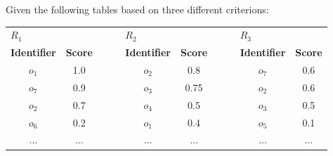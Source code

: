 \documentclass[12pt, a4paper]{report}
\newtheorem[style=M,bodystyle=\normalfont]{theorem}{Theorem}
\newtheorem[style=M,bodystyle=\normalfont]{corollary}{Corollary}
\newtheorem[style=M,bodystyle=\normalfont]{lemma}{Lemma}
\newtheorem[style=M,bodystyle=\normalfont]{definition}{Definition}
\begin{document}
    \begin{example}
        Given the following tables based on three different criterions: 
        \begin{table}[H]
            \centering
            \begin{tabular}{cccccccc}
            \multicolumn{1}{l}{$R_1$}                 & \multicolumn{1}{l}{}                & \multicolumn{1}{l}{$\:\:\:\:\:\:$} & \multicolumn{1}{l}{$R_2$}                & \multicolumn{1}{l}{}                & \multicolumn{1}{l}{$\:\:\:\:\:\:$} & \multicolumn{1}{l}{$R_3$}                & \multicolumn{1}{l}{}                \\ \cline{1-2} \cline{4-5} \cline{7-8} 
            \multicolumn{1}{|c}{\textbf{Identifier}} & \multicolumn{1}{c|}{\textbf{Score}} & \multicolumn{1}{c|}{\textbf{}}     & \multicolumn{1}{c}{\textbf{Identifier}} & \multicolumn{1}{c|}{\textbf{Score}} & \multicolumn{1}{c|}{\textbf{}}     & \multicolumn{1}{c}{\textbf{Identifier}} & \multicolumn{1}{c|}{\textbf{Score}} \\ \cline{1-2} \cline{4-5} \cline{7-8} 
            \multicolumn{1}{|c}{$o_1$}               & \multicolumn{1}{c|}{1.0}            & \multicolumn{1}{c|}{}              & \multicolumn{1}{c}{$o_2$}               & \multicolumn{1}{c|}{0.8}            & \multicolumn{1}{c|}{}              & \multicolumn{1}{c}{$o_7$}               & \multicolumn{1}{c|}{0.6}            \\  
            \multicolumn{1}{|c}{$o_7$}               & \multicolumn{1}{c|}{0.9}            & \multicolumn{1}{c|}{}              & \multicolumn{1}{c}{$o_3$}               & \multicolumn{1}{c|}{0.75}           & \multicolumn{1}{c|}{}              & \multicolumn{1}{c}{$o_2$}               & \multicolumn{1}{c|}{0.6}            \\  
            \multicolumn{1}{|c}{$o_2$}               & \multicolumn{1}{c|}{0.7}            & \multicolumn{1}{c|}{}              & \multicolumn{1}{c}{$o_4$}               & \multicolumn{1}{c|}{0.5}            & \multicolumn{1}{c|}{}              & \multicolumn{1}{c}{$o_3$}               & \multicolumn{1}{c|}{0.5}            \\  
            \multicolumn{1}{|c}{$o_6$}               & \multicolumn{1}{c|}{0.2}            & \multicolumn{1}{c|}{}              & \multicolumn{1}{c}{$o_1$}               & \multicolumn{1}{c|}{0.4}            & \multicolumn{1}{c|}{}              & \multicolumn{1}{c}{$o_5$}               & \multicolumn{1}{c|}{0.1}            \\  
            \multicolumn{1}{|c}{$\dots$}             & \multicolumn{1}{c|}{$\dots$}        & \multicolumn{1}{c|}{}              & \multicolumn{1}{c}{$\dots$}             & \multicolumn{1}{c|}{$\dots$}        & \multicolumn{1}{c|}{}              & \multicolumn{1}{c}{$\dots$}             & \multicolumn{1}{c|}{$\dots$}        \\ \cline{1-2} \cline{4-5} \cline{7-8} 

\end{tabular}
\end{table}
\end{example}
\end{document}
